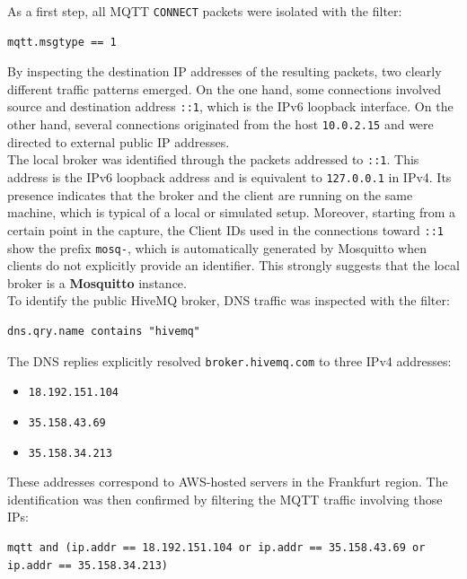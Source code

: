 \documentclass[a4paper,11pt]{article}
\begin{document}
As a first step, all MQTT \texttt{CONNECT} packets were isolated with the filter:

\begin{lstlisting}
mqtt.msgtype == 1
\end{lstlisting}

By inspecting the destination IP addresses of the resulting packets, two clearly
different traffic patterns emerged. On the one hand, some connections involved source
and destination address \texttt{::1}, which is the IPv6 loopback interface. On the
other hand, several connections originated from the host \texttt{10.0.2.15} and were
directed to external public IP addresses.\\

The local broker was identified through the packets addressed to \texttt{::1}. This
address is the IPv6 loopback address and is equivalent to \texttt{127.0.0.1} in IPv4.
Its presence indicates that the broker and the client are running on the same machine,
which is typical of a local or simulated setup. Moreover, starting from a certain
point in the capture, the Client IDs used in the connections toward \texttt{::1}
show the prefix \texttt{mosq-}, which is automatically generated by Mosquitto when
clients do not explicitly provide an identifier. This strongly suggests that the local
broker is a \textbf{Mosquitto} instance.\\

To identify the public HiveMQ broker, DNS traffic was inspected with the filter:

\begin{lstlisting}
dns.qry.name contains "hivemq"
\end{lstlisting}

The DNS replies explicitly resolved \texttt{broker.hivemq.com} to three IPv4
addresses:

\begin{itemize}
    \item \texttt{18.192.151.104}
    \item \texttt{35.158.43.69}
    \item \texttt{35.158.34.213}
\end{itemize}

These addresses correspond to AWS-hosted servers in the Frankfurt region. The
identification was then confirmed by filtering the MQTT traffic involving those IPs:

\begin{lstlisting}
mqtt and (ip.addr == 18.192.151.104 or ip.addr == 35.158.43.69 or ip.addr == 35.158.34.213)
\end{lstlisting}
\end{document}
